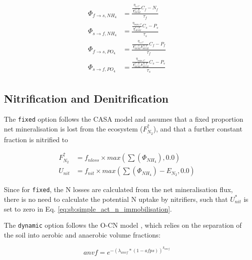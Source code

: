  \begin{subequations}
\begin{align}
\Phi_{f \rightarrow s,NH_4} &= \frac{\frac{\eta_{s,C}}{\chi_{SOM}^{C:N}} C_{f} - N_{f}}{\tau_{f}} \\
\Phi_{s \rightarrow f,NH_4} &= \frac{\frac{\eta_{min,C}}{\chi_{SOM}^{C:N}} C_{s} - P_{s}}{\tau_{s}} \\
\Phi_{f \rightarrow s,PO_4} &= \frac{\frac{\eta_{s,C}}{\chi_{SOM}^{C:N}\chi_{SOM}^{N:P}} C_{f} - P_{f}}{\tau_{f}} \\
\Phi_{s\rightarrow f,PO_4} &= \frac{\frac{\eta_{min,C}}{\chi_{SOM}^{C:N}\chi_{SOM}^{N:P}} C_{s} - P_{s}}{\tau_{s}} \\
\end{align}
\end{subequations}
 
\subsection{Nitrification and Denitrification}\label{sec:sb:nitrification_denitrification}

The \texttt{fixed} option follows the CASA model \cite{Wang:2010ba} and assumes that a fixed proportion net mineralisation is lost from the ecosystem ($F^{\uparrow}_{N_2}$), and that a further constant fraction is nitrified to 

\begin{subequations}\label{eq:sb:simple_fixed_loss}
\begin{align}
F^{\uparrow}_{N_2} &= f_{nloss} \times max(\sum(\Phi_{NH_4}),0.0) \\
U_{nit} &= f_{nit} \times max(\sum(\Phi_{NH_4})-E_{N_2},0.0) 
\end{align}
\end{subequations} 

Since for \texttt{fixed}, the N losses are calculated from the net mineralisation flux, there is no need to calculate the potential N uptake by nitrifiers, such that $U^{*}_{nit}$ is set to zero in Eq. \ref{eq:sb:simple_act_n_immobilisation}. 

The \texttt{dynamic} option follows the O-CN model \cite{Zaehle:2010cz}, which relies on the separation of the soil into aerobic and anaerobic volume fractions:

\begin{equation}\label{eq:sb:simple_anaerobic_vf}
anvf = e^{-(\lambda_{anvf} * (1-afps))^{k_{anvf}}}
\end{equation}

